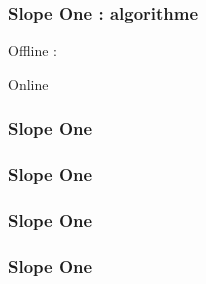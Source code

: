 \documentclass[t]{beamer}
\begin{document}
\begin{frame}
  \frametitle{Slope One : algorithme}

  \DontPrintSemicolon
  Offline :\;
  \begin{algorithm}[H]
    \bigskip
    Online\;
    
  \end{algorithm}


\end{frame}

\begin{frame}
  \frametitle{Slope One}

\end{frame}

\begin{frame}
  \frametitle{Slope One}

\end{frame}

\begin{frame}
  \frametitle{Slope One}

\end{frame}

\begin{frame}
  \frametitle{Slope One}

\end{frame}

\begin{frame}
  \frametitle{}

\end{frame}


\end{document}

